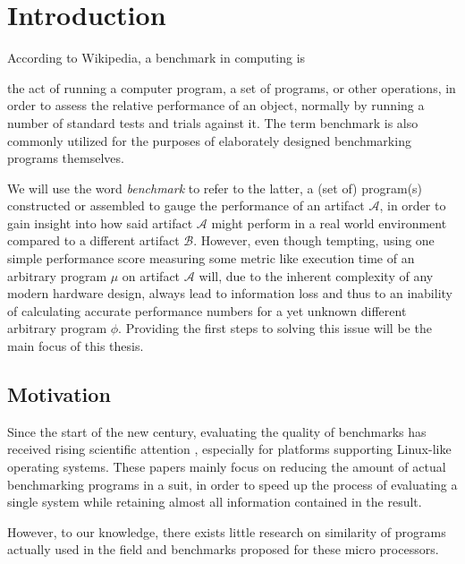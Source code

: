 \documentclass[../bachelor_paper.tex]{subfiles}
\begin{document}
\chapter{Introduction}
    \label{ch:intro}

According to Wikipedia, a benchmark in computing is
\begin{displayquote}
the act of running a computer program, a set of programs, or other operations, in order to assess the relative performance of an object, normally by running a number of standard tests and trials against it. The term benchmark is also commonly utilized for the purposes of elaborately designed benchmarking programs themselves. \cite{BenchmarkComputing2021}
\end{displayquote}
We will use the word \emph{benchmark} to refer to the latter, a (set of) program(s) constructed or assembled to gauge the performance of an artifact $\mathcal{A}$, in order to gain insight into how said artifact $\mathcal{A}$ might perform in a real world environment compared to a different artifact $\mathcal{B}$. However, even though tempting, using one simple performance score measuring some metric like execution time of an arbitrary program $\mu$ on artifact $\mathcal{A}$ will, due to the inherent complexity of any modern hardware design, always lead to information loss and thus to an inability of calculating accurate performance numbers for a yet unknown different arbitrary program $\phi$. Providing the first steps to solving this issue will be the main focus of this thesis.

\section{Motivation}
Since the start of the new century, evaluating the quality of benchmarks has received rising scientific attention \cite{eeckhoutDesigningComputerArchitecture2003,dujmovicEvolutionEvaluationSPEC1998,vandierendonckManyBenchmarksStress,phansalkarMeasuringProgramSimilarity2005,eeckhoutQuantifyingImpactInput}, especially for platforms supporting Linux-like operating systems. These papers mainly focus on reducing the amount of actual benchmarking programs in a suit, in order to speed up the process of evaluating a single system while retaining almost all information contained in the result. 

However, to our knowledge, there exists little research on similarity of programs actually used in the field and benchmarks proposed for these micro processors.
\end{document}
